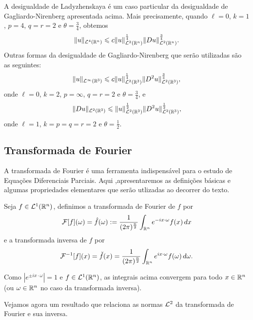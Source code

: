 A desigualdade de Ladyzhenskaya é um caso particular da desigualdade de Gagliardo-Nirenberg apresentada acima. Mais precisamente, quando $\ell = 0$, $k = 1$, $p = 4$, $q = r = 2$ e $\theta = \frac{3}{4}$, obtemos
\begin{equation} \label{eq:gagliardoL4}
    \Vert u \Vert_{\mathcal{L}^4(\mathbb{R}^n)} \leqslant c \Vert u \Vert_{\mathcal{L}^2(\mathbb{R}^n)}^{\frac{1}{4}} \Vert Du \Vert_{\mathcal{L}^2(\mathbb{R}^n)}^{\frac{3}{4}}.
\end{equation}
Outras formas da desigualdade de Gagliardo-Nirenberg que serão utilizadas são as seguintes:
\begin{equation} \label{eq:gagliardoinf}
    \Vert u \Vert_{\mathcal{L}^\infty(\mathbb{R}^3)} \leqslant c \Vert u \Vert_{\mathcal{L}^2(\mathbb{R}^3)}^{\frac{1}{4}} \Vert D^2 u \Vert_{\mathcal{L}^2(\mathbb{R}^3)}^{\frac{3}{4}},
\end{equation}
onde $\ell = 0$, $k = 2$, $p = \infty$, $q = r = 2$ e $\theta = \frac{3}{4}$, e
\begin{equation} \label{eq:gagliardoDu}
    \Vert Du \Vert_{\mathcal{L}^2(\mathbb{R}^3)} \leqslant \Vert u \Vert_{\mathcal{L}^2(\mathbb{R}^3)}^{\frac{1}{2}} \Vert D^2 u \Vert_{\mathcal{L}^2(\mathbb{R}^3)}^{\frac{1}{2}},
\end{equation}
onde $\ell = 1$, $k = p = q = r = 2$ e $\theta = \frac{1}{2}$.

\subsection{Transformada de Fourier}

A transformada de Fourier é uma ferramenta indispensável para o estudo de Equações Diferenciais Parciais. Aqui ,apresentaremos as definições básicas e algumas propriedades elementares que serão utlizadas ao decorrer do texto.

\begin{dbox}
    Seja $f \in \mathcal{L}^1(\mathbb{R}^n)$, definimos a transformada de Fourier de $f$ por
    \[
        \mathcal{F}[f](\omega) = \hat f(\omega) := \frac{1}{(2\pi)^{\frac{n}{2}}} \int_{\mathbb{R}^n} e^{-i x \cdot \omega} f(x) \,dx
    \]
    e a transformada inversa de $f$ por
    \[
        \mathcal{F}^{-1}[f](x) =  \check f(x) = \frac{1}{(2\pi)^{\frac{n}{2}}} \int_{\mathbb{R}^n} e^{i x \cdot \omega} f(\omega) \,d\omega.
    \]
\end{dbox}

Como $|e^{\pm ix \cdot \omega}| = 1$ e $f \in \mathcal{L}^1(\mathbb{R}^n)$, as integrais acima convergem para todo $x \in \mathbb{R}^n$ (ou $\omega \in \mathbb{R}^n$ no caso da transformada inversa).

Vejamos agora um resultado que relaciona as normas $\mathcal{L}^2$ da transformada de Fourier e sua inversa.

